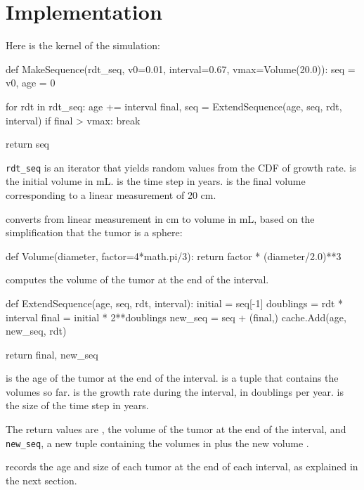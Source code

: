 \documentclass[12pt]{book}
\theoremstyle{exercise}
\begin{document}
\section{Implementation}

Here is the kernel of the simulation:

\begin{code}
def MakeSequence(rdt_seq, v0=0.01, interval=0.67, vmax=Volume(20.0)):
    seq = v0,
    age = 0

    for rdt in rdt_seq:
        age += interval
        final, seq = ExtendSequence(age, seq, rdt, interval)
        if final > vmax:
            break

    return seq
\end{code}

\verb"rdt_seq" is an iterator that yields 
random values from the CDF of growth rate.
 is the initial volume in mL.   is the time step
in years.   is the final volume corresponding to a linear
measurement of 20 cm.

 converts from linear measurement in cm to volume
in mL, based on the simplification that the tumor is a sphere:

\begin{code}
def Volume(diameter, factor=4*math.pi/3):
    return factor * (diameter/2.0)**3
\end{code}

 computes the volume of the tumor at the
end of the interval.

\begin{code}
def ExtendSequence(age, seq, rdt, interval):
    initial = seq[-1]
    doublings = rdt * interval
    final = initial * 2**doublings
    new_seq = seq + (final,)
    cache.Add(age, new_seq, rdt)
    
    return final, new_seq
\end{code}

 is the age of the tumor at the end of the interval.
 is a tuple that contains the volumes so far.   is
the growth rate during the interval, in doublings per year.
 is the size of the time step in years.

The return values are , the volume of the
tumor at the end of the interval, and \verb"new_seq", a new
tuple containing the volumes in  plus the new volume
.

 records the age and size of each tumor at the end
of each interval, as explained in the next section.
\end{document}
